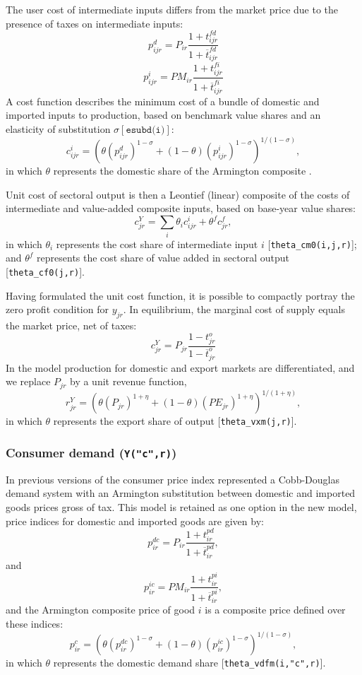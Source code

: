 The user cost of intermediate inputs differs from the market price
due to the presence of taxes on intermediate inputs:
$$p^d_{ijr} = P_{ir} \frac{1+t^{fd}_{ijr}}{1+\overline{t}^{fd}_{ijr}}$$
$$p^i_{ijr} = \mathit{PM}_{ir}
\frac{1+t^{fi}_{ijr}}{1+\overline{t}^{fi}_{ijr}}$$ A \CES cost function
describes the minimum cost of a bundle of domestic and imported inputs
to production, based on benchmark value shares and an elasticity of
substitution $\sigma [\texttt{esubd(i)}]$:
$$c^i_{ijr} = \left( \theta (p^d_{ijr})^{1-\sigma} +
             (1-\theta) (p^i_{ijr})^{1-\sigma}
\right)^{1/(1-\sigma)},$$
in which $\theta$ represents the domestic share of the Armington
composite  \hfill {}.

Unit cost of sectoral output is then a Leontief (linear) composite of
the costs of intermediate and value-added composite inputs, based on
base-year value shares:
$$c^Y_{jr} = \sum_i \theta_i c^i_{ijr} + \theta^f c^f_{jr},$$
in which $\theta_i$ represents the cost share of intermediate input
$i$ [{\small \texttt{theta\_cm0(i,j,r)}}]; and
$\theta^f$ represents the cost share of value added in sectoral
output [{\small \texttt{theta\_cf0(j,r)}}].

Having formulated the unit cost function, it is possible to compactly
portray the zero profit condition for $y_{jr}$. In equilibrium, the
marginal cost of supply equals the market price, net of taxes:
\begin{equation}
c^Y_{jr} = P_{jr} \frac{1-t^o_{jr}}{1-\overline{t}^o_{jr}}
\end{equation}
In the \SOE model production for domestic and export
markets are differentiated, and we replace $P_{jr}$ by a unit
revenue function,
$$r^Y_{jr} = \left( \theta (P_{jr})^{1+\eta} +
(1-\theta) (\mathit{PE}_{jr})^{1+\eta} \right)^{1/(1+\eta)},$$
in which $\theta$ represents the export share of output
[{\small \texttt{theta\_vxm(j,r)}}].

\subsubsection[Private demand]{Consumer demand (\texttt{Y("c",r)})}

In previous versions of \GTAPINGAMS the consumer price index
represented a Cobb-Douglas demand system with an Armington
substitution between domestic and imported goods prices gross of tax.
This model is retained as one option in the new model, price indices
for domestic and imported goods are given by:
$$p^{dc}_{ir} = P_{ir} \frac{1+t^{pd}_{ir}}{1+\overline{t}^{pd}_{ir}},$$
and
$$p^{ic}_{ir} = \mathit{PM}_{ir} \frac{1+t^{pi}_{ir}}{1+\overline{t}^{pi}_{ir}},$$
and the Armington composite price of good $i$ is a \CES composite price
defined over these indices:
$$p^c_{ir} = \left(\theta (p^{dc}_{ir})^{1-\sigma} +
                (1-\theta) (p^{ic}_{ir})^{1-\sigma}
\right)^{1/(1-\sigma)},$$
in which $\theta$ represents the domestic demand share
[{\small \texttt{theta\_vdfm(i,"c",r)}}].

